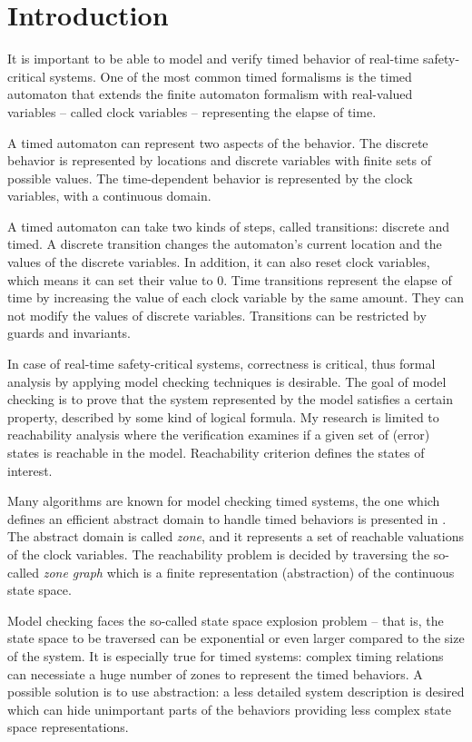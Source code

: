 \chapter{Introduction}
\label{chap:introduction}
It is important to be able to model and verify timed behavior of
real-time safety-critical systems. One of the most common timed formalisms is 
the timed automaton that extends the finite automaton formalism
with real-valued variables -- called clock variables -- representing the elapse
of time.

A timed automaton can represent two aspects of the behavior. The discrete behavior
is represented by locations and discrete variables with finite sets of possible
values. The time-dependent behavior is represented by the clock variables, with
a continuous domain.

A timed automaton can take two kinds of steps, called transitions: discrete and timed.
A discrete transition changes the automaton's current location and the values of the discrete variables. In addition, it can also reset clock variables, which means it can set their value to 0.
Time transitions represent the elapse of time by increasing the value of each clock variable by the same amount. They can not modify the values of discrete variables. Transitions can be restricted by guards and invariants.

In case of real-time safety-critical systems, correctness is critical, thus
formal  analysis by applying model checking techniques is desirable.
The goal of model checking is to prove that the system represented by the
model satisfies a certain property, described by some kind of
logical formula. 
My research is limited to reachability analysis where the verification examines if a given set of (error) states is reachable in the model. Reachability criterion defines the states of interest.

Many algorithms are known for model checking timed systems, the one which
defines an efficient abstract domain to handle timed behaviors is presented in
\cite{bengtsson2004timed}. The abstract domain is called \emph{zone}, and it represents a set of reachable valuations of the clock
variables. The reachability problem is decided by traversing the so-called \emph{zone graph}
which is a finite representation (abstraction) of the continuous
state space.

Model checking faces the so-called state space explosion problem --
that is, the state space to be traversed can be exponential or even larger compared to the size of the system.
It is especially true for timed systems: complex timing relations can necessiate a huge number of zones to represent the timed behaviors.
A possible solution is to use abstraction: a less detailed system description is desired which can
hide unimportant parts of the behaviors providing less complex state space
representations.

